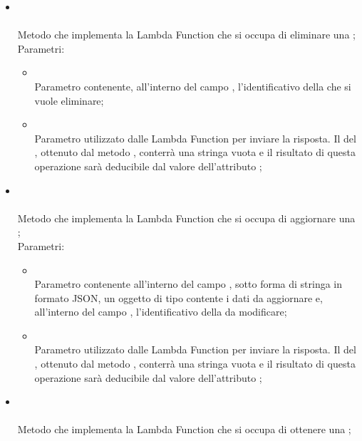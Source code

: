 \begin{itemize}
\begin{itemize}
\begin{itemize}
		\end{itemize}
		\item[] \\ \\		Metodo che implementa la Lambda Function che si occupa di eliminare una ;\\
		Parametri:
		\begin{itemize}
			\item {} \\
			Parametro contenente, all'interno del campo , l'identificativo della  che si vuole eliminare;
			\item {} \\
			Parametro utilizzato dalle Lambda Function per inviare la risposta. Il  del , ottenuto dal metodo , conterrà una stringa vuota e il risultato di questa operazione sarà deducibile dal valore dell'attributo ;
		\end{itemize}
		\item[] \\ \\		Metodo che implementa la Lambda Function che si occupa di aggiornare una ;\\
		Parametri:
		\begin{itemize}
			\item {} \\
			Parametro contenente all'interno del campo , sotto forma di stringa in formato JSON, un oggetto di tipo  contente i dati da aggiornare e, all'interno del campo , l'identificativo della  da modificare;
			\item {} \\
			Parametro utilizzato dalle Lambda Function per inviare la risposta. Il  del , ottenuto dal metodo , conterrà una stringa vuota e il risultato di questa operazione sarà deducibile dal valore dell'attributo ;
		\end{itemize}
		\item[]  \\\\		Metodo che implementa la Lambda Function che si occupa di ottenere una ;\\

\end{itemize}
\end{itemize}

